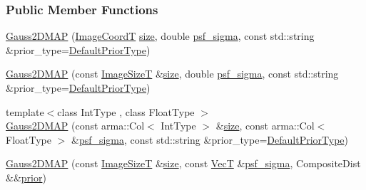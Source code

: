 \subsubsection*{Public Member Functions}
\begin{DoxyCompactItemize}
\item 
\hyperlink{classmappel_1_1Gauss2DMAP_a4c58624b9f032c724b22c031fb627447}{Gauss2\+D\+M\+AP} (\hyperlink{classmappel_1_1ImageFormat2DBase_a45e9234d63c357f34ca56c72c12b9e9c}{Image\+CoordT} \hyperlink{classmappel_1_1ImageFormat2DBase_a3be77d2aa6ec9f3815322732950c2a60}{size}, double \hyperlink{classmappel_1_1Gauss2DModel_acb73f86ea080515e843f47be9502b271}{psf\+\_\+sigma}, const std\+::string \&prior\+\_\+type=\hyperlink{classmappel_1_1Gauss2DModel_af4b934d290782da4f5f7e8e7e5090a94}{Default\+Prior\+Type})
\item 
\hyperlink{classmappel_1_1Gauss2DMAP_a27c22bc08e0ecae87c49ced230b5bf3d}{Gauss2\+D\+M\+AP} (const \hyperlink{classmappel_1_1ImageFormat2DBase_a49cccf61eb2a768a202634d27fcd81d5}{Image\+SizeT} \&\hyperlink{classmappel_1_1ImageFormat2DBase_a3be77d2aa6ec9f3815322732950c2a60}{size}, double \hyperlink{classmappel_1_1Gauss2DModel_acb73f86ea080515e843f47be9502b271}{psf\+\_\+sigma}, const std\+::string \&prior\+\_\+type=\hyperlink{classmappel_1_1Gauss2DModel_af4b934d290782da4f5f7e8e7e5090a94}{Default\+Prior\+Type})
\item 
{\footnotesize template$<$class Int\+Type , class Float\+Type $>$ }\\\hyperlink{classmappel_1_1Gauss2DMAP_a07076fe8fa59c043fba1d42886942dbe}{Gauss2\+D\+M\+AP} (const arma\+::\+Col$<$ Int\+Type $>$ \&\hyperlink{classmappel_1_1ImageFormat2DBase_a3be77d2aa6ec9f3815322732950c2a60}{size}, const arma\+::\+Col$<$ Float\+Type $>$ \&\hyperlink{classmappel_1_1Gauss2DModel_acb73f86ea080515e843f47be9502b271}{psf\+\_\+sigma}, const std\+::string \&prior\+\_\+type=\hyperlink{classmappel_1_1Gauss2DModel_af4b934d290782da4f5f7e8e7e5090a94}{Default\+Prior\+Type})
\item 
\hyperlink{classmappel_1_1Gauss2DMAP_a2988beb550bd9fdc60f3a5f724e9b167}{Gauss2\+D\+M\+AP} (const \hyperlink{classmappel_1_1ImageFormat2DBase_a49cccf61eb2a768a202634d27fcd81d5}{Image\+SizeT} \&\hyperlink{classmappel_1_1ImageFormat2DBase_a3be77d2aa6ec9f3815322732950c2a60}{size}, const \hyperlink{namespacemappel_a2225ad69f358daa3f4f99282a35b9a3a}{VecT} \&\hyperlink{classmappel_1_1Gauss2DModel_acb73f86ea080515e843f47be9502b271}{psf\+\_\+sigma}, Composite\+Dist \&\&\hyperlink{classmappel_1_1PointEmitterModel_a393839f8eb1dd3d61c9369377742ba0e}{prior})

\end{DoxyCompactItemize}
